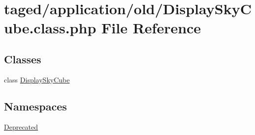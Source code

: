 \hypertarget{_display_sky_cube_8class_8php}{}\section{taged/application/old/\+Display\+Sky\+Cube.class.\+php File Reference}
\label{_display_sky_cube_8class_8php}
\subsection*{Classes}
\begin{DoxyCompactItemize}
\item 
class \hyperlink{class_display_sky_cube}{Display\+Sky\+Cube}
\end{DoxyCompactItemize}
\subsection*{Namespaces}
\begin{DoxyCompactItemize}
\item 
 \hyperlink{namespace_deprecated}{Deprecated}
\end{DoxyCompactItemize}

